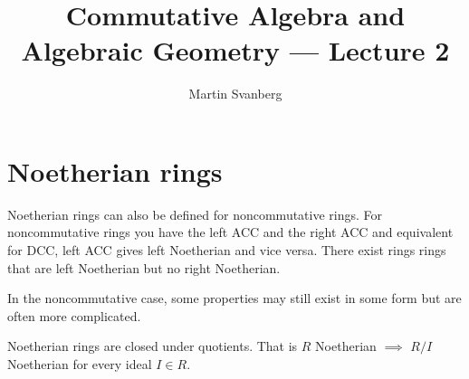 \documentclass{./template}
\title{Commutative Algebra and Algebraic Geometry --- Lecture 2}
\author{Martin Svanberg}
\begin{document}
  \maketitle
  \section{Noetherian rings}
  Noetherian rings can also be defined for noncommutative rings. For noncommutative rings you have the left ACC and the right ACC and equivalent for DCC, left ACC gives left Noetherian and vice versa. There exist rings rings that are left Noetherian but no right Noetherian.

  In the noncommutative case, some properties may still exist in some form but are often more complicated.

  {\lemma Noetherian rings are closed under quotients. That is $R$ Noetherian $\implies$ $R/I$ Noetherian for every ideal $I\in R$.}
\end{document}
